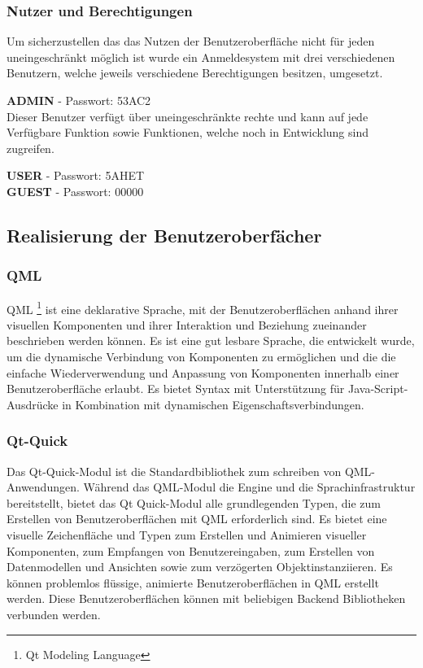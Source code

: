 \subsubsection{Nutzer und Berechtigungen}

Um sicherzustellen das das Nutzen der Benutzeroberfläche nicht für jeden uneingeschränkt möglich ist wurde ein Anmeldesystem mit drei verschiedenen Benutzern, welche jeweils verschiedene Berechtigungen besitzen, umgesetzt.

{\small \textbf{ADMIN}} - Passwort: 53AC2\\

Dieser Benutzer verfügt über uneingeschränkte rechte und kann auf jede Verfügbare Funktion sowie Funktionen, welche noch in Entwicklung sind zugreifen.

{\small \textbf{USER}} - Passwort: 5AHET\\

{\small \textbf{GUEST}} - Passwort: 00000\\


\newpage

\subsection{Realisierung der Benutzeroberfächer}

\subsubsection{QML} \label{sec:qml}
QML \footnote{Qt Modeling Language} ist eine deklarative Sprache, mit der Benutzeroberflächen anhand ihrer visuellen Komponenten und ihrer Interaktion und Beziehung zueinander beschrieben werden können. Es ist eine gut lesbare Sprache, die entwickelt wurde, um die dynamische Verbindung von Komponenten zu ermöglichen und die die einfache Wiederverwendung und Anpassung von Komponenten innerhalb einer Benutzeroberfläche erlaubt. Es bietet  Syntax mit Unterstützung für Java-Script-Ausdrücke in Kombination mit dynamischen Eigenschaftsverbindungen.

\subsubsection{Qt-Quick}
Das Qt-Quick-Modul ist die Standardbibliothek zum schreiben von QML-Anwendungen. Während das QML-Modul die Engine und die Sprachinfrastruktur bereitstellt, bietet das Qt Quick-Modul alle grundlegenden Typen, die zum Erstellen von Benutzeroberflächen mit QML erforderlich sind. Es bietet eine visuelle Zeichenfläche und Typen zum Erstellen und Animieren visueller Komponenten, zum Empfangen von Benutzereingaben, zum Erstellen von Datenmodellen und Ansichten sowie zum verzögerten Objektinstanziieren. Es können problemlos flüssige, animierte Benutzeroberflächen in QML erstellt werden. Diese Benutzeroberflächen können mit beliebigen Backend Bibliotheken verbunden werden.


